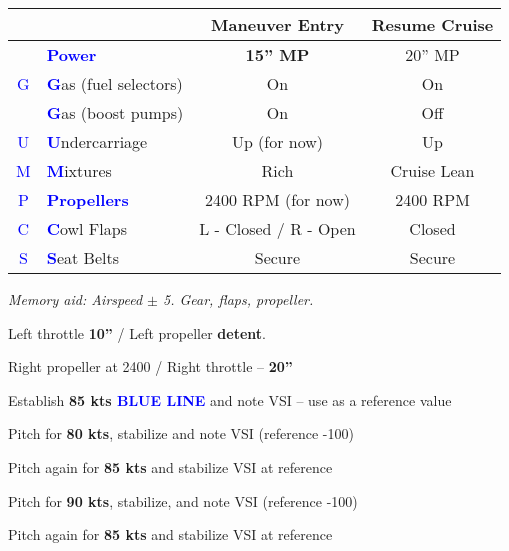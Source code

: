 {\begin{table}[H]
\centering
\begin{tabular}{|c|l|c|c|}
\hline
                    &                                                 & \textbf{Maneuver Entry} & \textbf{Resume Cruise} \\ \hline
                    & \textcolor{blue}{\textbf{Power}}                & \textbf{15'' MP}        & 20'' MP                \\ \hline
\textcolor{blue}{G} & \textcolor{blue}{\textbf{G}}as (fuel selectors) & On                      & On                     \\
                    & \textcolor{blue}{\textbf{G}}as (boost pumps)    & On                      & Off                    \\ \hline
\textcolor{blue}{U} & \textcolor{blue}{\textbf{U}}ndercarriage        & Up (for now)            & Up                     \\ \hline
\textcolor{blue}{M} & \textcolor{blue}{\textbf{M}}ixtures             & Rich                    & Cruise Lean            \\ \hline
\textcolor{blue}{P} & \textcolor{blue}{\textbf{Propellers}}           & 2400 RPM (for now)      & 2400 RPM               \\ \hline
\textcolor{blue}{C} & \textcolor{blue}{\textbf{C}}owl Flaps           & L - Closed / R - Open   & Closed                 \\ \hline
\textcolor{blue}{S} & \textcolor{blue}{\textbf{S}}eat Belts           & Secure                  & Secure                 \\ \hline
\end{tabular}
\end{table}

\emph{Memory aid: Airspeed $\pm$ 5. Gear, flaps, propeller.}

Left throttle \textbf{10''} / Left propeller \textbf{detent}.

Right propeller at 2400 / Right throttle – \textbf{20''}

Establish \vyse \textbf{85 kts \textcolor{blue}{BLUE LINE}} and note VSI – use as a reference value

Pitch for \textbf{80 kts}, stabilize and note VSI (reference -100)

Pitch again for \textbf{85 kts} and stabilize VSI at reference

Pitch for \textbf{90 kts}, stabilize, and note VSI (reference -100)

Pitch again for \textbf{85 kts} and stabilize VSI at reference

}
